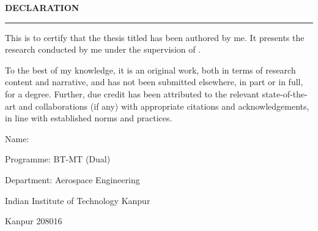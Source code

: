 
\baselineskip
\centerline{\textbf{DECLARATION}}
\noindent\rule{16cm}{1pt}
\baselineskip


\noindent
This is to certify that the thesis titled \textbf{\thesistitle} has been authored by me. It presents the research conducted by me under the supervision of \supervisorname.

To the best of my knowledge, it is an original work, both in terms of research content and narrative, and has not been submitted elsewhere, in part or in full, for a degree. Further, due credit has been attributed to the relevant state-of-the-art and collaborations (if any) with appropriate citations and acknowledgements, in line with established norms and practices.

\vspace*{2.5cm}
\begin{flushright}
Name: \authorname

Programme: BT-MT (Dual)

Department: Aerospace Engineering

Indian Institute of Technology Kanpur

Kanpur 208016
\end{flushright}
